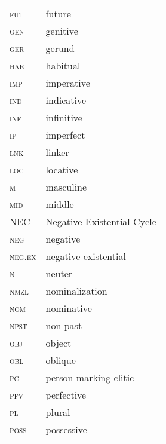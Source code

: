 \documentclass[output=paper,colorlinks,citecolor=brown]{langscibook}
\begin{document}
\begin{tabularx}{.45\textwidth}{ll}
    \textsc{fut} & future\\
    \textsc{gen} & genitive\\
    \textsc{ger} & gerund\\
    \textsc{hab} & habitual\\
    \textsc{imp} & imperative\\
\textsc{ind} & indicative\\
\textsc{inf} & infinitive\\
\textsc{ip} & imperfect\\
\textsc{lnk} & linker\\
\textsc{loc} & locative\\
\textsc{m} & masculine\\
\textsc{mid} & middle\\
\textsc{NEC} & Negative Existential Cycle\\
\textsc{neg} & negative\\
\textsc{neg.ex} & negative existential\\
\textsc{n} & neuter\\
\textsc{nmzl} & nominalization\\
\textsc{nom} & nominative\\
\textsc{npst} & non-past\\
\textsc{obj} & object\\
\textsc{obl} & oblique\\
\textsc{pc} & person-marking clitic\\
\textsc{pfv} & perfective\\
\textsc{pl} & plural\\
\textsc{poss} & possessive\\
\end{tabularx}
\end{document}
